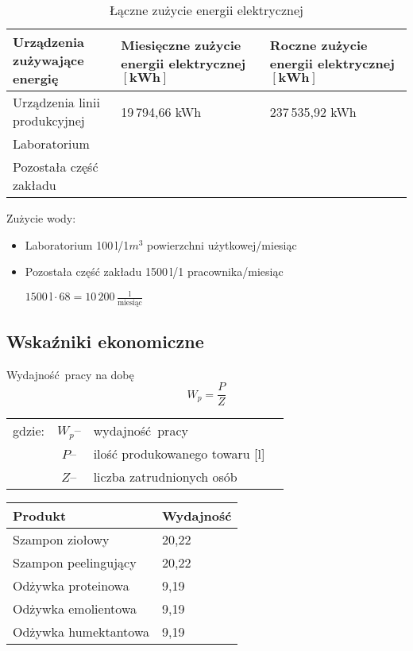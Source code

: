 \begin{table}[h]
	\centering
	\caption{Łączne zużycie energii elektrycznej}
	\begin{tabular}{lll}
		\hline
		\makecell[l]{\textbf{Urządzenia zużywające} \\ \textbf{energię}} & \makecell[l]{\textbf{Miesięczne zużycie} \\ \textbf{energii elektrycznej} \\ $[\mathrm{\mathbf{kWh}}]$} & \makecell[l]{\textbf{Roczne zużycie} \\ \textbf{energii elektrycznej} \\ $[\mathrm{\mathbf{kWh}}]$}\\
		\hline\hline
		\makecell[l]{Urządzenia linii \\ produkcyjnej} & 19\,794,66 kWh & 237\,535,92 kWh \\
		\hline
		Laboratorium &  &  \\
		\hline
		\makecell[l]{Pozostała część \\ zakładu} &  &  \\
		\hline
	\end{tabular}
\end{table}

Zużycie wody:
\begin{itemize}
	\item Laboratorium 100\,l/1$m^{3}$ powierzchni użytkowej/miesiąc
	\item Pozostała część zakładu 1500\,l/1 pracownika/miesiąc

		$1500\,\mathrm{l} \cdot 68 = 10\,200\,\frac{\mathrm{l}}{\text{miesiąc}}$
\end{itemize}

\subsection{Wskaźniki ekonomiczne}

Wydajność pracy na dobę
\begin{equation}
	W_{p} = \frac{P}{Z}
\end{equation}
\begin{tabular}{rcll}
	gdzie:&$W_{p}$--&wydajność pracy \\
	&$P$--&ilość produkowanego towaru [l] \\
	&$Z$--&liczba zatrudnionych osób \\
\end{tabular}

\begin{center}
	\begin{tabular}{ll}
		\hline
		Produkt & Wydajność \\
		\hline\hline
		Szampon ziołowy & 20,22 \\
		Szampon peelingujący & 20,22 \\
		Odżywka proteinowa & 9,19 \\
		Odżywka emolientowa & 9,19 \\
		Odżywka humektantowa & 9,19 \\
		\hline
	\end{tabular}
\end{center}

